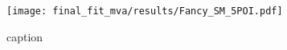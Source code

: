 \begin{figure}[!htbp]
	\centering
	\texttt{[image: final\_fit\_mva/results/Fancy\_SM\_5POI.pdf]}
  \caption{caption}
  \label{fig:5POI-fancyMU}
\end{figure}